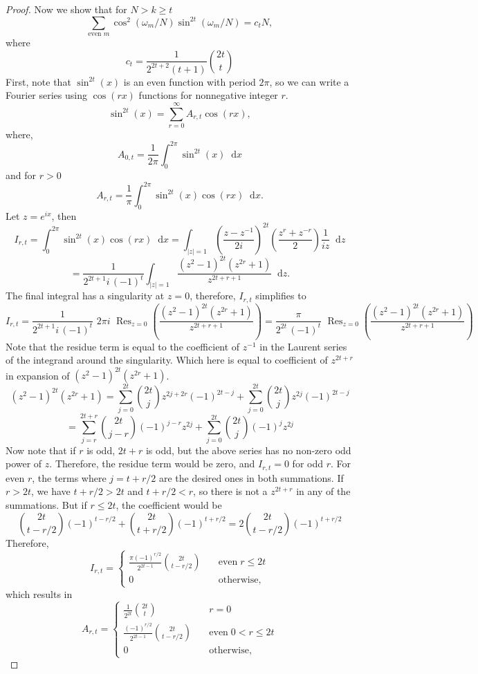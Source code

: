 \documentclass[12pt]{article}
\theoremstyle{definition}
\begin{document}
\begin{proof}
Now we show that for $N > k\geq t$
\[
\sum_{\text{even }m}\cos^2\left(\omega_m/N\right)\sin^{2t}\left(\omega_m/N\right) = c_t N,
\]
where \[
c_t = \frac{1}{2^{2t+2}(t+1)} \binom{2t}{t}
\]
First, note that $\sin^{2t}\left(x\right)$ is an even function with period $2\pi$, so we can write a Fourier series using $\cos\left(rx\right)$ functions for nonnegative integer $r$. 
\[
\sin^{2t}\left(x\right) = \sum_{r= 0 }^\infty A_{r,t} \cos\left(rx\right),
\]
where,
\newcommand{\diff}{\mathop{}\!\mathrm{d}}
\[
A_{0,t} = \frac{1}{2\pi}\int_0^{2\pi} \sin^{2t}\left(x\right)\diff x
\]
and for $r > 0$
\[
A_{r,t} = \frac{1}{\pi}\int_0^{2\pi}\sin^{2t}\left(x\right)\cos\left(rx\right)\diff x.
\]
Let $z = e^{ix}$, then
\[
I_{r,t} = \int_0^{2\pi}\sin^{2t}\left(x\right)\cos\left(rx\right)\diff x = \int_{|z| = 1}\left(\frac{z-z^{-1}}{2i}\right)^{2t}\left(\frac{z^r+z^{-r}}{2}\right)\frac{1}{iz}\diff z 
\]
\[
= \frac{1}{2^{2t+1}i\,(-1)^{t}}\int_{|z| = 1}\frac{\left(z^2-1\right)^{2t}\left(z^{2r}+1\right)}{z^{2t+r+1}}\diff z .
\]
The final integral has a singularity at $z = 0$, therefore, $I_{r,t}$ simplifies to 
\[
I_{r,t} = \frac{1}{2^{2t+1}i\,(-1)^{t}}\,\,2\pi i \,\,\mathop{\mathrm{Res}}_{z = 0}\left(\frac{\left(z^2-1\right)^{2t}\left(z^{2r}+1\right)}{z^{2t+r+1}}\right) =  \frac{\pi}{2^{2t}\,(-1)^t} \,\,\mathop{\mathrm{Res}}_{z = 0}\left(\frac{\left(z^2-1\right)^{2t}\left(z^{2r}+1\right)}{z^{2t+r+1}}\right)
\]
Note that the residue term is equal to the coefficient of $z^{-1}$ in the Laurent series of the integrand around the singularity. Which here is equal to coefficient of $z^{2t+r}$ in expansion of $\left(z^2-1\right)^{2t}\left(z^{2r}+1\right)$. 
\[
\left(z^2-1\right)^{2t}\left(z^{2r}+1\right) = \sum_{j = 0}^{2t}\binom{2t}{j} z^{2j+2r}\left(-1\right)^{2t-j}+\sum_{j = 0}^{2t}\binom{2t}{j} z^{2j}\left(-1\right)^{2t-j}
\]
\[
= \sum_{j = r}^{2t+r}\binom{2t}{j-r} \left(-1\right)^{j-r}z^{2j}+\sum_{j = 0}^{2t}\binom{2t}{j} \left(-1\right)^{j}z^{2j}
\]
Now note that if $r$ is odd, $2t+r$ is odd, but the above series has no non-zero odd power of $z$. Therefore, the residue term would be zero, and $I_{r,t} = 0$ for odd $r$. For even $r$, the terms where $j = t + r/2$ are the desired ones in both summations. If $r > 2t$, we have $t + r/2 > 2t$ and $t + r/2 < r$, so there is not a $z^{2t+r}$ in any of the summations. But if $r \leq 2t$, the coefficient would be
\[
\binom{2t}{t-r/2} \left(-1\right)^{t -r/2}+\binom{2t}{t + r/2} \left(-1\right)^{t + r/2} = 2\binom{2t}{t-r/2} \left(-1\right)^{t +r/2}
\]
Therefore,
\[
I_{r,t} =  \begin{cases}
    \frac{\pi(-1)^{r/2}}{2^{2t-1}}\binom{2t}{t-r/2}\quad &\text{even} \; r \leq 2t\\
    0 \quad &\text{otherwise},
\end{cases}
\]
which results in
\[
A_{r,t} =  \begin{cases}
    \frac{1}{2^{2t}}\binom{2t}{t}\quad &r = 0\\
    \frac{(-1)^{r/2}}{2^{2t-1}}\binom{2t}{t-r/2}\quad &\text{even} \; 0<r \leq 2t\\
    0 \quad &\text{otherwise},
\end{cases}
\]


\end{proof}
\end{document}
